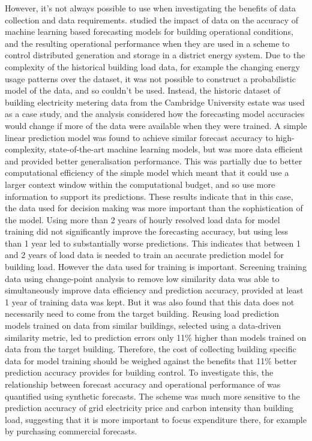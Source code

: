 However, it's not always possible to use  when investigating the benefits of data collection and data requirements.  studied the impact of data on the accuracy of machine learning based forecasting models for building operational conditions, and the resulting operational performance when they are used in a  scheme to control distributed generation and storage in a district energy system.
Due to the complexity of the historical building load data, for example the changing energy usage patterns over the dataset, it was not possible to construct a probabilistic model of the data, and so  couldn't be used. Instead, the historic dataset of building electricity metering data from the Cambridge University estate was used as a case study, and the analysis considered how the forecasting model accuracies would change if more of the data were available when they were trained.
A simple linear prediction model was found to achieve similar forecast accuracy to high-complexity, state-of-the-art machine learning models, but was more data efficient and provided better generalisation performance. This was partially due to better computational efficiency of the simple model which meant that it could use a larger context window within the computational budget, and so use more information to support its predictions. These results indicate that in this case, the data used for decision making was more important than the sophistication of the model.
Using more than 2 years of hourly resolved load data for model training did not significantly improve the forecasting accuracy, but using less than 1 year led to substantially worse predictions. This indicates that between 1 and 2 years of load data is needed to train an accurate prediction model for building load. However the data used for training is important. Screening training data using change-point analysis to remove low similarity data was able to simultaneously improve data efficiency and prediction accuracy, provided at least 1 year of training data was kept. But it was also found that this data does not necessarily need to come from the target building. Reusing load prediction models trained on data from similar buildings, selected using a data-driven similarity metric, led to prediction errors only 11\% higher than models trained on data from the target building. Therefore, the cost of collecting building specific data for model training should be weighed against the benefits that 11\% better prediction accuracy provides for building control. To investigate this, the relationship between forecast accuracy and operational performance of  was quantified using synthetic forecasts. The  scheme was much more sensitive to the prediction accuracy of grid electricity price and carbon intensity than building load, suggesting that it is more important to focus expenditure there, for example by purchasing commercial forecasts.

